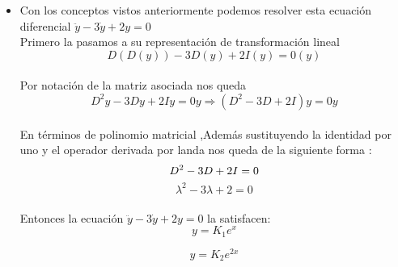 \documentclass[10pt,a4paper]{article}
\begin{document}
{{{{{{{{{{{{\begin{itemize}
\begin{equation*}
T(\bar{u})\Rightarrow A{\bar{u}}
\end{equation*}\\

Ahora se escribirá  (3) de la anterior forma quedando:
\begin{equation}\tag{Entonces $D-\alpha I=0$ (4) }
Dy-\alpha Iy=Oy\Rightarrow (D-\alpha I)y=Oy
\end{equation}\\
Gracias al teorema de Kaley Hamilton que nos dice " Toda matriz es raíz de su polinomio característico,es decir podemos pasar de un polinomio matricial a uno escalar, entonces (4) lo puedo expresar como:
\begin{equation*}
\lambda - \alpha =0\Rightarrow \lambda =\alpha
\end{equation*}\\
\item Con los conceptos vistos anteriormente podemos resolver esta ecuación diferencial $ \ddot{y}-3\dot{y}+2y=0$\\

Primero la pasamos a su representación de transformación lineal
\begin{equation*}
D(D(y))-3D(y)+2I(y)=0(y)
\end{equation*}\\
Por notación de la matriz asociada nos queda
\begin{equation*}
D^{2}y-3Dy+2Iy=0y\Rightarrow (D^{2}-3D+2I)y=0y
\end{equation*}\\
En términos de polinomio matricial ,Además sustituyendo la identidad por uno y el operador derivada por landa nos queda de la siguiente forma :
\begin{equation*}
D^{2}-3D+2I=0\\
\end{equation*}
\begin{equation}\tag{$\lambda _1=1\,$ y $\lambda _2=2$}
\lambda ^{2}-3\lambda +2 =0
\end{equation}\\

Entonces la ecuación $ \ddot{y}-3\dot{y}+2y=0$ la satisfacen:
\begin{equation*}
y=K_1e^{x}
\end{equation*}

\begin{equation*}
y=K_2e^{2x}
\end{equation*}
 \end{itemize}
  
}}}}}}}}}}}}
\end{document}
